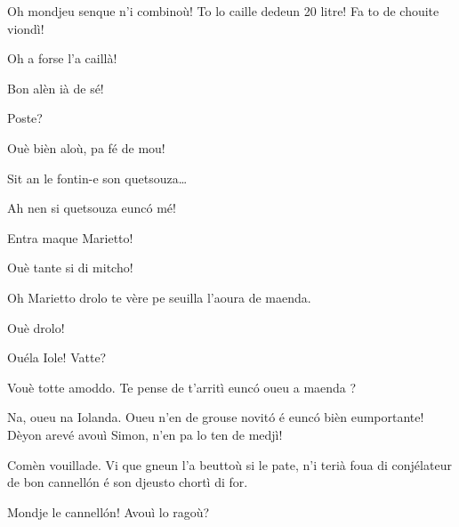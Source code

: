 \begin{drama}
\Sahlammspeaks Oh mondjeu senque n'i combinoù! To lo caille dedeun 20 litre! Fa to de chouite viondì!


\Sahlammspeaks Oh a forse l'a caillà!


\Sahlammspeaks Bon alèn ià de sé!


\Cienspeaks {} Poste?

\Sahlammspeaks Ouè bièn aloù, pa fé de mou!


\Cienspeaks {} Sit an le fontin-e son quetsouza\ldots

\Marietto Ah nen si quetsouza eunc\'o mé!


\Cienspeaks Entra maque Marietto!

\Mariettospeaks Ouè tante si di mitcho!




\Iolandaspeaks Oh Marietto drolo te vère pe seuilla l’aoura de maenda.

\Cienspeaks Ouè drolo!

\Mariettospeaks Ouéla Iole! Vatte?

\Iolandaspeaks Vouè totte amoddo. Te pense de t’arritì eunc\'o oueu a maenda ?


\Cienspeaks Na, oueu na Iolanda. Oueu n’en de grouse novit\'o é eunc\'o bièn eumportante! Dèyon arevé avouì Simon, n'en pa lo ten de medjì!

\Iolandaspeaks Comèn vouillade. Vi que gneun l'a beuttoù si le pate, n’i terià foua di conjélateur  de bon cannell\'on é son djeusto chortì di for.

\Mariettospeaks Mondje le cannell\'on! Avouì lo ragoù?


\end{drama}
